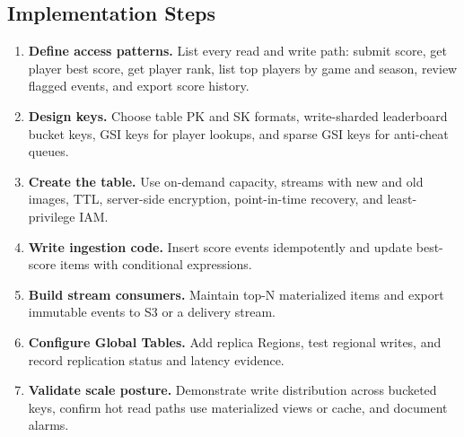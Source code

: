 \subsection*{Implementation Steps}
\begin{enumerate}
    \item \textbf{Define access patterns.} List every read and write path: submit score, get player best score, get player rank, list top players by game and season, review flagged events, and export score history.
    \item \textbf{Design keys.} Choose table PK and SK formats, write-sharded leaderboard bucket keys, GSI keys for player lookups, and sparse GSI keys for anti-cheat queues.
    \item \textbf{Create the table.} Use on-demand capacity, streams with new and old images, TTL, server-side encryption, point-in-time recovery, and least-privilege IAM.
    \item \textbf{Write ingestion code.} Insert score events idempotently and update best-score items with conditional expressions.
    \item \textbf{Build stream consumers.} Maintain top-N materialized items and export immutable events to S3 or a delivery stream.
    \item \textbf{Configure Global Tables.} Add replica Regions, test regional writes, and record replication status and latency evidence.
    \item \textbf{Validate scale posture.} Demonstrate write distribution across bucketed keys, confirm hot read paths use materialized views or cache, and document alarms.
\end{enumerate}

